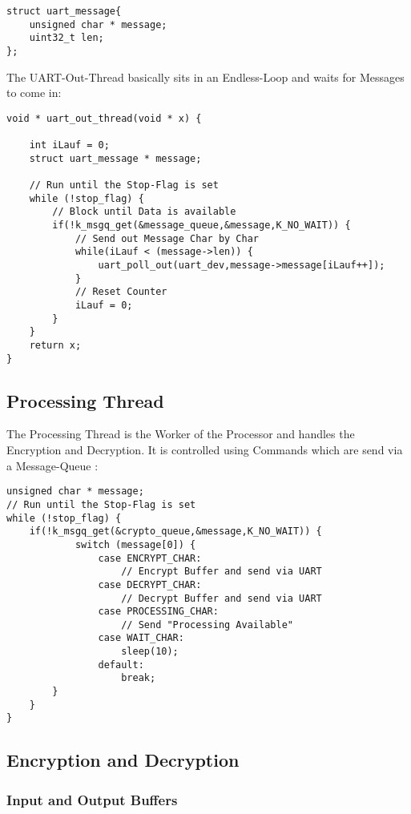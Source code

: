 \begin{lstlisting}[style=CStyle,caption=Message Struct Definition]
struct uart_message{
	unsigned char * message;
	uint32_t len;
};
\end{lstlisting}

The UART-Out-Thread basically sits in an Endless-Loop and waits
for Messages to come in:

\begin{lstlisting}[style=CStyle,caption=UART Out Thread Pseudo-Code]
void * uart_out_thread(void * x) {

	int iLauf = 0;
	struct uart_message * message;

	// Run until the Stop-Flag is set
	while (!stop_flag) {
		// Block until Data is available
		if(!k_msgq_get(&message_queue,&message,K_NO_WAIT)) {
			// Send out Message Char by Char
			while(iLauf < (message->len)) {
				uart_poll_out(uart_dev,message->message[iLauf++]);
			}
			// Reset Counter
			iLauf = 0;
		}
	}
	return x;
}
\end{lstlisting}

\pagebreak

\subsection{Processing Thread}

The Processing Thread is the Worker of the Processor and handles the
Encryption and Decryption.
It is controlled using Commands which are send via a Message-Queue :

\begin{lstlisting}[style=CStyle,caption=Processing Thread Pseudo-Code]
unsigned char * message;
// Run until the Stop-Flag is set
while (!stop_flag) {
	if(!k_msgq_get(&crypto_queue,&message,K_NO_WAIT)) {
			switch (message[0]) {
				case ENCRYPT_CHAR:
					// Encrypt Buffer and send via UART
				case DECRYPT_CHAR:
					// Decrypt Buffer and send via UART
				case PROCESSING_CHAR:
					// Send "Processing Available"
				case WAIT_CHAR:
					sleep(10);
				default:
					break;
		}
	}
}
\end{lstlisting}

\subsection{Encryption and Decryption}

\subsubsection{Input and Output Buffers}


